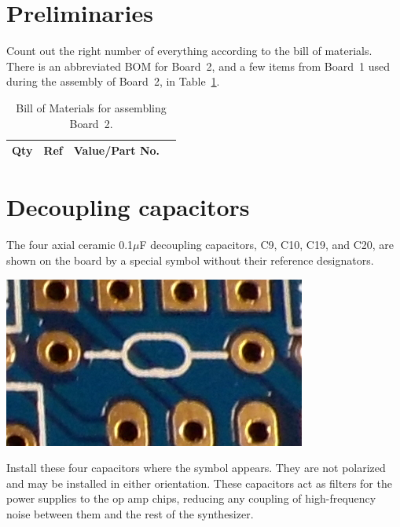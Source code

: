 \section{Preliminaries}

Count out the right number of everything according to the bill of materials. 
There is an abbreviated BOM for Board~2, and a few items from Board~1 used
during the assembly of Board~2, in Table~\ref{tab:b2bom}.

\begin{table}
{\centering
{}
\vspace{\baselineskip}

\begin{tabular}{rp{1in}cp{3in}}
  \textbf{Qty} & \textbf{Ref} & \textbf{Value/Part No.} & \\ \hline

\end{tabular}\par}
\caption{Bill of Materials for assembling Board~2.}\label{tab:b2bom}
\end{table}

\section{Decoupling capacitors}

The four axial ceramic 0.1$\mu$F decoupling capacitors, C9, C10, C19, and
C20, are shown on the board by a special symbol without their reference
designators.

\noindent\includegraphics[width=\linewidth]{decoup-symbol.jpg}

Install these four capacitors where the symbol appears.  They are not
polarized and may be installed in either orientation.  These capacitors act
as filters for the power supplies to the op amp chips, reducing any coupling
of high-frequency noise between them and the rest of the synthesizer.

